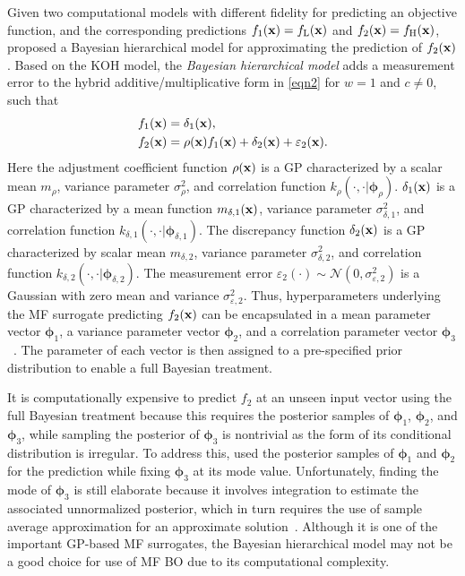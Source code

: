 \documentclass[journal ]{new-aiaa}
\begin{document}
Given two computational models with different fidelity for predicting an objective function, and the corresponding predictions $f_1({\bf x})= f_\text{L}({\bf x})$ and $f_2({\bf x})= f_\text{H}({\bf x})$,
\citet{Qian2008} proposed a Bayesian hierarchical model for approximating the prediction of $f_\text{2}({\bf x})$.
Based on the KOH model, the \textit{Bayesian hierarchical model} adds a measurement error to the hybrid additive/multiplicative form in \cref{eqn2} for $w=1$ and $c \neq 0$, such that
\begin{subequations}\label{eqn19}
	\begin{align}
		f_1({\bf x}) & = \delta_1({\bf x}) \label{eqn19-1},\\
		f_\text{2}({\bf x}) & = \rho({\bf x})f_\text{1}({\bf x}) + \delta_2({\bf x})+\varepsilon_2({\bf x}) \label{eqn19-2}.
	\end{align}
\end{subequations}
Here the adjustment coefficient function $\rho({\bf x})$ is a GP characterized by a scalar mean $m_\rho$, variance parameter $\sigma^2_\rho$, and correlation function $k_\rho(\cdot,\cdot|{\boldsymbol \phi}_\rho)$.
$\delta_\text{1}({\bf x})$ is a GP characterized by a mean function $m_{\delta,1}({\bf x})$, variance parameter $\sigma^2_{\delta,1}$, and correlation function $k_{\delta,1}(\cdot,\cdot|{\boldsymbol \phi}_{\delta,1})$.
The discrepancy function $\delta_2({\bf x})$ is a GP characterized by scalar mean $m_{\delta,2}$, variance parameter $\sigma^2_{\delta,2}$, and correlation function $k_{\delta,2}(\cdot,\cdot|{\boldsymbol \phi}_{\delta,2})$.
The measurement error $\varepsilon_\text{2}(\cdot) \sim \mathcal{N}(0,\sigma^2_{\varepsilon,2})$ is a Gaussian with zero mean and variance $\sigma^2_{\varepsilon,2}$.
Thus, hyperparameters underlying the MF surrogate predicting $f_\text{2}({\bf x})$ can be encapsulated in a mean parameter vector ${\boldsymbol \phi}_1$, a variance parameter vector ${\boldsymbol \phi}_2$, and
a correlation parameter vector ${\boldsymbol \phi}_3$~\citep{Qian2008}. 
The parameter of each vector is then assigned to a pre-specified prior distribution to enable a full Bayesian treatment.

It is computationally expensive to predict $f_2$ at an unseen input vector using the full Bayesian treatment because this requires the posterior samples of ${\boldsymbol \phi}_1$, ${\boldsymbol \phi}_2$, and ${\boldsymbol \phi}_3$, while sampling the posterior of ${\boldsymbol \phi}_3$ is nontrivial as the form of its conditional distribution is irregular.
To address this, \citet{Qian2008} used the posterior samples of ${\boldsymbol \phi}_1$ and ${\boldsymbol \phi}_2$ for the prediction while fixing ${\boldsymbol \phi}_3$ at its mode value.
Unfortunately, finding the mode of ${\boldsymbol \phi}_3$ is still elaborate because it involves integration to estimate the associated unnormalized posterior, which in turn requires the use of sample average approximation for an approximate solution~\citep{Verweij2003}.
Although it is one of the important GP-based MF surrogates, the Bayesian hierarchical model may not be a good choice for use of MF BO due to its computational complexity.
\end{document}

